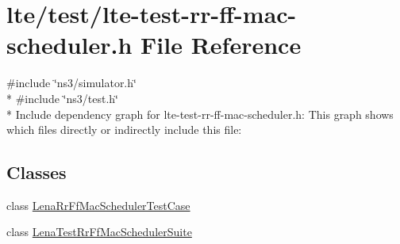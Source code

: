 \hypertarget{lte-test-rr-ff-mac-scheduler_8h}{}\section{lte/test/lte-\/test-\/rr-\/ff-\/mac-\/scheduler.h File Reference}
\label{lte-test-rr-ff-mac-scheduler_8h}
{\ttfamily \#include \char`\"{}ns3/simulator.\+h\char`\"{}}\\*
{\ttfamily \#include \char`\"{}ns3/test.\+h\char`\"{}}\\*
Include dependency graph for lte-\/test-\/rr-\/ff-\/mac-\/scheduler.h\+:
This graph shows which files directly or indirectly include this file\+:
\subsection*{Classes}
\begin{DoxyCompactItemize}
\item 
class \hyperlink{classLenaRrFfMacSchedulerTestCase}{Lena\+Rr\+Ff\+Mac\+Scheduler\+Test\+Case}
\item 
class \hyperlink{classLenaTestRrFfMacSchedulerSuite}{Lena\+Test\+Rr\+Ff\+Mac\+Scheduler\+Suite}
\end{DoxyCompactItemize}

